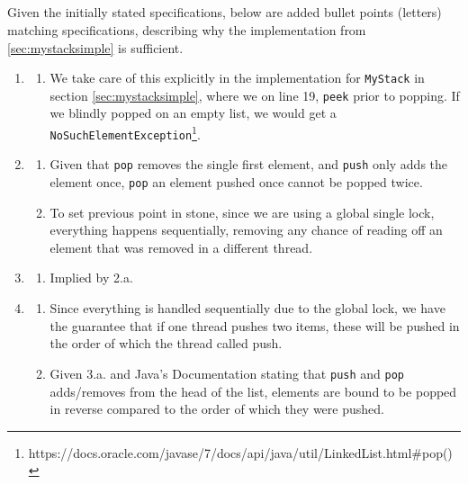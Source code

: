 \documentclass[a5paper]{article}
\begin{document}
\subsection{}
Given the initially stated  specifications, below are added bullet points (letters) matching specifications, describing why the implementation from \ref{sec:mystacksimple} is sufficient.
\begin{enumerate}

\item 
    \begin{enumerate}
        \item We take care of this explicitly in the implementation for \texttt{MyStack} in section \ref{sec:mystacksimple}, where we on line 19, \texttt{peek} prior to popping.
            If we blindly popped on an empty list, we would get a \texttt{NoSuchElementException}\footnote{https://docs.oracle.com/javase/7/docs/api/java/util/LinkedList.html\#pop()}.
    \end{enumerate}
\item
    \begin{enumerate}
        \item Given that \texttt{pop} removes the single first element, and \texttt{push} only adds the element once, \texttt{pop} an element pushed once cannot be popped twice.
        \item To set previous point in stone, since we are using a global single lock, everything happens sequentially, removing any chance of reading off an element that was removed in a different thread.
    \end{enumerate}
\item
    \begin{enumerate}
        \item Implied by 2.a.
    \end{enumerate}
\item 
    \begin{enumerate}
        \item Since everything is handled sequentially due to the global lock, we have the guarantee that if one thread pushes two items, these will be pushed
            in the order of which the thread called push. 
        \item Given 3.a. and Java's Documentation stating that \texttt{push} and \texttt{pop} adds/removes from the head of the list, elements are bound to be popped
            in reverse compared to the order of which they were pushed.
    \end{enumerate}
\end{enumerate}
\end{document}
